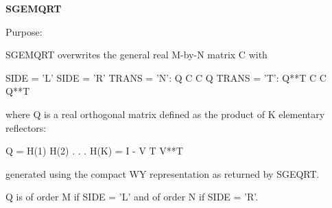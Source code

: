 {\bfseries S\+G\+E\+M\+Q\+R\+T} 

 \begin{DoxyParagraph}{Purpose\+: }
\begin{DoxyVerb} SGEMQRT overwrites the general real M-by-N matrix C with

                 SIDE = 'L'     SIDE = 'R'
 TRANS = 'N':      Q C            C Q
 TRANS = 'T':   Q**T C            C Q**T

 where Q is a real orthogonal matrix defined as the product of K
 elementary reflectors:

       Q = H(1) H(2) . . . H(K) = I - V T V**T

 generated using the compact WY representation as returned by SGEQRT. 

 Q is of order M if SIDE = 'L' and of order N  if SIDE = 'R'.\end{DoxyVerb}
 
\end{DoxyParagraph}

